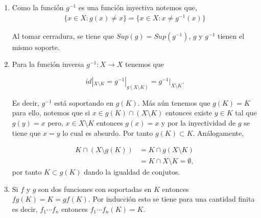 \begin{ob} \label{ob:sop_fun_inversa}
\begin{enumerate}
Sea $g:X \to X$ un homeomorfismo que está soportado en $K$.
    \item Como la función $g^{-1}$ es una función inyectiva notemos que, 
    \begin{align*}
        \{x \in X : g(x) \neq x \}  = \{x \in X : x \neq g^{-1}(x) \}         
    \end{align*}
    
    Al tomar cerradura, se tiene que $Sup(g)  =  Sup(g^{-1})$,  $g$ y $g^{-1}$ tienen el mismo soporte.  
    \item Para la función inversa $g^{-1}:X \to X$ tenemos que 

$$id|_{X \setminus K}=g^{-1}|_{g(X \setminus K)}=g^{-1}|_{X \setminus K}.$$

Es decir, $g^{-1}$ está soportando en $g(K).$ Más aún tenemos que $g(K) = K$ para ello, notemos que si $x \in g(K) \cap (X \setminus K)$ entonces existe $y \in K$ tal que $g(y)=x$  pero,  $x \in X \setminus K$ entonces $g(x)=x$ y por la inyectividad de $g$ se tiene que $x =y$ lo cual es absurdo. Por tanto $g(K) \subset K.$ Análogamente, 

\begin{align*}
    K \cap (X \setminus g(K)) & = K \cap g( X \setminus K) \\ 
    & = K \cap  X \setminus K = \emptyset,
\end{align*}
por tanto $K \subset g(K)$ dando la igualdad de conjutos. 

\item Si $f$ y $g$ son dos funciones con soportadas en $K$ entonces $fg(K)=K=gf(K).$ Por inducción esto se tiene para una cantidad finita es decir, $f_1 \cdots f_n$ entonces $f_1 \cdots f_n(K)=K.$  
\end{enumerate}

\end{ob}

